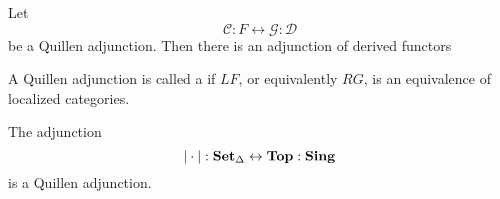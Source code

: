 \documentclass[main.tex]{subfiles}
\begin{document}
\begin{proposition}
  \label{prop:derived_functors_form_adjunction}
  Let
  \begin{equation*}
    \mathcal{C} : F \leftrightarrow \mathcal{G} : \mathcal{D}
  \end{equation*}
  be a Quillen adjunction. Then there is an adjunction of derived functors
\end{proposition}

\begin{definition}
  \label{def:quillen_equivalence}
  A Quillen adjunction is called a  if $LF$, or equivalently $RG$, is an equivalence of localized categories.
\end{definition}

\begin{theorem}
  The adjunction
  \begin{equation*}
    {| \cdot |} : \operatorname{\mathbf{Set}_{\Delta}} \leftrightarrow \mathbf{Top} : \mathbf{Sing}
  \end{equation*}
  is a Quillen adjunction.
\end{theorem}
\end{document}
